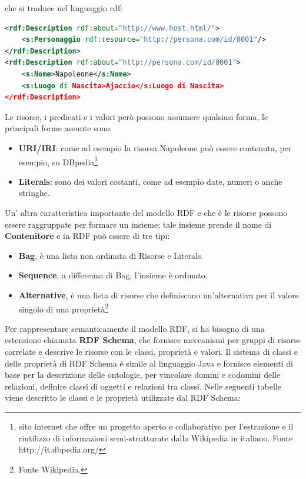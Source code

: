 \documentclass[a4paper,11pt]{article}
\begin{document}
\begin{enumerate}
\begin{enumerate}[label*=\arabic*.]
che si traduce nel linguaggio rdf:
\begin{lstlisting}[language=XML, basicstyle=\large]
<rdf:Description rdf:about="http://www.host.html/">
	<s:Personaggio rdf:resource="http://persona.com/id/0001"/>
</rdf:Description>
<rdf:Description rdf:about="http://persona.com/id/0001">
 	<s:Nome>Napoleone</s:Nome>
 	<s:Luogo di Nascita>Ajaccio</s:Luogo di Nascita>
</rdf:Description>

\end{lstlisting}

Le risorse, i predicati e i valori però possono assumere qualsiasi forma, le principali forme assunte sono:
			\begin{itemize}
				\item \textbf{URI/IRI}: come ad esempio la risorsa Napoleone può essere contenuta, per esempio, su DBpedia\footnote{ sito internet che offre un progetto aperto e collaborativo per l’estrazione e il riutilizzo di informazioni semi-strutturate dalla Wikipedia in italiano. Fonte http://it.dbpedia.org/}
				\item \textbf{Literals}: sono dei valori costanti, come ad esempio date, numeri o anche stringhe.
			\end{itemize}

Un' altra caratteristica importante del modello RDF e che è le risorse possono essere raggruppate per formare un insieme; tale insieme prende il nome di \textbf{Contenitore} e in RDF può essere di tre tipi:
			\begin{itemize}
				\item \textbf{Bag}, è una lista non ordinata di Risorse e Literals.
				\item \textbf{Sequence}, a differenza di Bag, l'insieme è ordinato.
				\item \textbf{Alternative}, è una lista di risorse che definiscono un'alternativa per il valore singolo di una proprietà\footnote{Fonte Wikipedia.}
			\end{itemize}\newpage		
Per rappresentare semanticamente il modello RDF, si ha bisogno di una estensione chiamata \textbf{RDF Schema}, che fornisce meccanismi per gruppi di risorse correlate e descrive le risorse con le classi, proprietà e valori. Il sistema di classi e delle proprietà di RDF Schema è simile al linguaggio Java e fornisce elementi di base per la descrizione delle ontologie, per vincolare domini e codomini delle relazioni, definire classi di oggetti e relazioni tra classi.
Nelle seguenti tabelle viene descritto le classi e le proprietà utilizzate dal RDF Schema:	\newline
		

\end{enumerate}
\end{enumerate}
\end{document}

